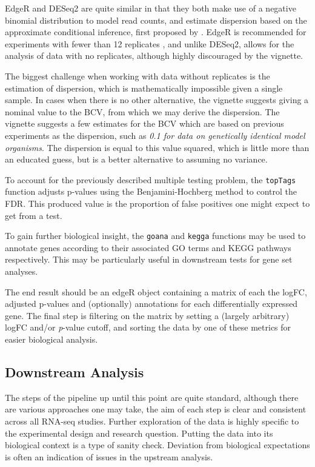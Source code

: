 EdgeR and DESeq2 are quite similar in that they both make use of a negative binomial distribution to model read counts, and estimate dispersion based on the approximate conditional inference, first proposed by \cite{cox1987parameter}.  EdgeR is recommended for experiments with fewer than 12 replicates \citep{schurch2015evaluation}, and unlike DESeq2, allows for the analysis of data with no replicates, although highly discouraged by the vignette. 

The biggest challenge when working with data without replicates is the estimation of dispersion, which is mathematically impossible given a single sample. In cases when there is no other alternative, the vignette suggests giving a nominal value to the \ac{BCV}, from which we may derive the dispersion. The vignette suggests a few estimates for the \ac{BCV} which are based on previous experiments as the dispersion, such as \textit{0.1 for data on genetically identical model organisms}. The dispersion is equal to this value squared, which is little more than an educated guess, but is a better alternative to assuming no variance.

To account for the previously described multiple testing problem, the \texttt{topTags} function adjusts p-values using the Benjamini-Hochberg method \citep{benjamini1995controlling} to control the \ac{FDR}. This produced value is the proportion of false positives one might expect to get from a test. 

To gain further biological insight, the \texttt{goana} and \texttt{kegga} functions may be used to annotate genes according to their associated \ac{GO} terms and \ac{KEGG} pathways respectively. This may be particularly useful in downstream tests for gene set analyses.

The end result should be an edgeR object containing a matrix of each the \ac{logFC}, adjusted p-values and (optionally) annotations for each differentially expressed gene. The final step is filtering on the matrix by setting a (largely arbitrary) \ac{logFC} and/or \textit{p}-value cutoff, and sorting the data by one of these metrics for easier biological analysis.

\subsection{Downstream Analysis}
The steps of the pipeline up until this point are quite standard, although there are various approaches one may take, the aim of each step is clear and consistent across all RNA-seq studies. Further exploration of the data is highly specific to the experimental design and research question. Putting the data into its biological context is a type of sanity check. Deviation from biological expectations is often an indication of issues in the upstream analysis.

